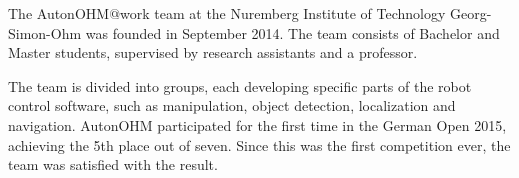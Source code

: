 The AutonOHM$@$work team at the Nuremberg Institute of Technology Georg-Simon-Ohm
was founded in September 2014. The team consists of Bachelor and Master students, supervised by research assistants and a professor. 

The team is divided into groups, each developing specific parts of the robot control software, such as manipulation,
object detection, localization and navigation.
AutonOHM participated for the first time in the German Open 2015, achieving the 5th place out of seven. Since this was the first competition ever, the team was satisfied with the result.

